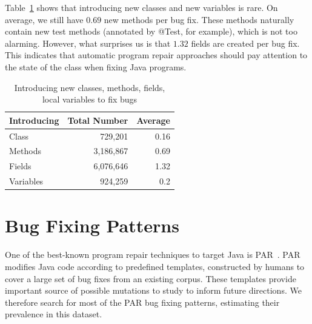 \documentclass{sig-alternate-05-2015}
\newcommand{\todo}[1]
  {{\scriptsize \textbf{\color{red} {#1}}}}
\begin{document}
Table~\ref{tbl:new} shows that introducing new
classes and new variables is rare. On average, we still have $0.69$ new methods
per bug fix. These methods naturally contain new test methods (annotated by
@Test, for example), which is not too alarming. However,
what surprises us is that $1.32$ fields are created per bug fix.  This indicates
that automatic program repair approaches should pay attention to the state of
the class when fixing Java programs.

\begin{table}
\centering
  \begin{tabular}{l | r  r }
  \toprule
  Introducing & Total Number & Average \\ \midrule
  Class & 729,201 & 0.16 \\ 
  Methods & 3,186,867 & 0.69 \\ 
  Fields & 6,076,646 & 1.32 \\ 
  Variables & 924,259 & 0.2 \\ 
\bottomrule
  \end{tabular}
  \caption{Introducing new classes, methods, fields, local variables to fix bugs}
  \label{tbl:new}
\vspace{-0.5cm}
\end{table}


\section{Bug Fixing Patterns}\label{sec:method}

One of the best-known program repair techniques to target Java is
PAR~\cite{kim2013}.  PAR
modifies Java code according to predefined templates, constructed by humans
to cover a large set of bug fixes from an existing corpus.  These templates provide
important source of possible 
mutations to study to inform future directions. 
We therefore search for most of the PAR bug fixing patterns,
estimating their prevalence in this
dataset.

\end{document}
